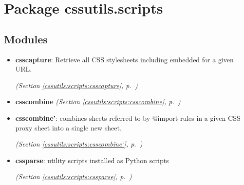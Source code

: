 %
%
%


\section{Package cssutils.scripts}

    \label{cssutils:scripts}


\subsection{Modules}

\begin{itemize}
\setlength{\parskip}{0ex}
\item \textbf{csscapture}: 
Retrieve all CSS stylesheets including embedded for a given URL.


  \textit{(Section \ref{cssutils:scripts:csscapture}, p.~\pageref{cssutils:scripts:csscapture})}

\item \textbf{csscombine}
  \textit{(Section \ref{cssutils:scripts:csscombine}, p.~\pageref{cssutils:scripts:csscombine})}

\item \textbf{csscombine'}: combines sheets referred to by @import rules in a given CSS proxy sheet
into a single new sheet. 


  \textit{(Section \ref{cssutils:scripts:csscombine'}, p.~\pageref{cssutils:scripts:csscombine'})}

\item \textbf{cssparse}: 
utility scripts installed as Python scripts


  \textit{(Section \ref{cssutils:scripts:cssparse}, p.~\pageref{cssutils:scripts:cssparse})}

\end{itemize}


